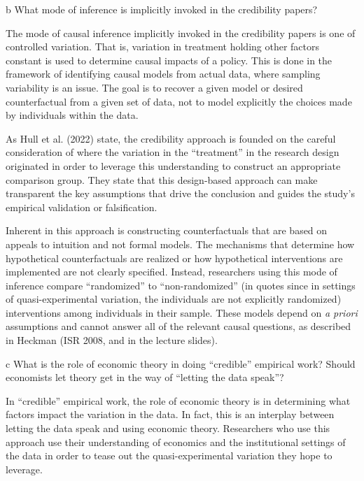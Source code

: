\documentclass{article}
\begin{document}
\begin{problem}{b}
What mode of inference is implicitly invoked in the credibility papers?
\end{problem}

The mode of causal inference implicitly invoked in the credibility papers is one of controlled variation. That is, variation in treatment holding other factors constant is used to determine causal impacts of a policy. This is done in the framework of identifying causal models from actual data, where sampling variability is an issue. The goal is to recover a given model or desired counterfactual from a given set of data, not to model explicitly the choices made by individuals within the data. 

As Hull et al. (2022) state, the credibility approach is founded on the careful consideration of where the variation in the ``treatment'' in the research design originated in order to leverage this understanding to construct an appropriate comparison group. They state that this design-based approach can make transparent the key assumptions that drive the conclusion and guides the study's empirical validation or falsification.


Inherent in this approach is constructing counterfactuals that are based on appeals to intuition and not formal models. The mechanisms that determine how hypothetical counterfactuals are realized or how hypothetical interventions are implemented are not clearly specified. Instead, researchers using this mode of inference compare ``randomized'' to ``non-randomized'' (in quotes since in settings of quasi-experimental variation, the individuals are not explicitly randomized) interventions among individuals in their sample. These models depend on \textit{a priori} assumptions and cannot answer all of the relevant causal questions, as described in Heckman (ISR 2008, and in the lecture slides).


\begin{problem}{c}
What is the role of economic theory in doing “credible” empirical work? Should economists let theory get in the way of “letting the data speak”?
\end{problem}

In ``credible'' empirical work, the role of economic theory is in determining what factors impact the variation in the data. In fact, this is an interplay between letting the data speak and using economic theory. Researchers who use this approach use their understanding of economics and the institutional settings of the data in order to tease out the quasi-experimental variation they hope to leverage.
\end{document}
